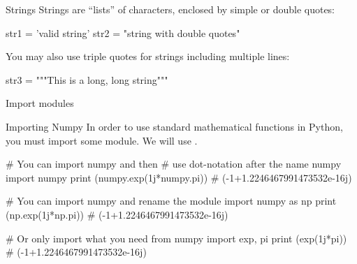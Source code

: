 \documentclass[hyperref={pdfpagelabels=false},table, handout]{beamer}
\begin{document}
\begin{frame}[fragile]{Strings}
Strings are ``lists'' of characters, enclosed by simple or double quotes:
\begin{python}
str1 = 'valid string'
str2 = "string with double quotes"
\end{python}
\pause
You may also use \alert{triple quotes} for strings including multiple lines:
\begin{python}
str3 = """This is
a long,
long string"""
\end{python}
\end{frame}

\begin{frame}[fragile]{Import modules}
\begin{block}{Importing Numpy}
In order to use standard mathematical functions in Python, you must import some module.
 We will use .
\end{block}

\begin{python}
# You can import numpy and then
# use dot-notation after the name numpy
import numpy
print (numpy.exp(1j*numpy.pi))
# (-1+1.2246467991473532e-16j)
\end{python}

\pause

\begin{python}
# You can import numpy and rename the module
import numpy as np
print (np.exp(1j*np.pi))
# (-1+1.2246467991473532e-16j)
\end{python}

\pause

\begin{python}
# Or only import what you need
from numpy import exp, pi
print (exp(1j*pi))
# (-1+1.2246467991473532e-16j)
\end{python}

\end{frame}
\end{document}
